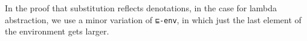 In the proof that substitution reflects denotations, in the case for
lambda abstraction, we use a minor variation of \texttt{⊑-env}, in which
just the last element of the environment gets larger.

\begin{fence}
\begin{code}%
\>[0]\AgdaSpace{}%
\AgdaSymbol{:}\AgdaSpace{}%
\AgdaSpace{}%
\AgdaSymbol{\{}\AgdaSymbol{\}}\AgdaSpace{}%
\AgdaSymbol{\{}\AgdaSpace{}%
\AgdaSymbol{:}\AgdaSpace{}%
\AgdaSpace{}%
\AgdaSymbol{\}}\AgdaSpace{}%
\AgdaSymbol{\{}\AgdaSpace{}%
\AgdaSpace{}%
\AgdaSpace{}%
\AgdaSymbol{\}}\<%
\\
\>[0][@{}l@{\AgdaIndent{0}}]%
\>[2]\AgdaSpace{}%
\AgdaSymbol{(}\AgdaSpace{}%
\AgdaSpace{}%
\AgdaSymbol{)}\AgdaSpace{}%
\AgdaSpace{}%
\AgdaSpace{}%
\AgdaSpace{}%
\<%
\\
%
\>[2]%
\>[1521I]\AgdaSpace{}%
\AgdaSpace{}%
\<%
\\
\>[.][@{}l@{}]\<[1521I]%
\>[4]\AgdaComment{-----------------}\<%
\\
%
\>[2]\AgdaSpace{}%
\AgdaSymbol{(}\AgdaSpace{}%
\AgdaSpace{}%
\AgdaSymbol{)}\AgdaSpace{}%
\AgdaSpace{}%
\AgdaSpace{}%
\AgdaSpace{}%
\<%
\\
\>[0]\AgdaSpace{}%
\AgdaSpace{}%
\AgdaSpace{}%
\AgdaSymbol{=}\AgdaSpace{}%
\AgdaSpace{}%
\AgdaSpace{}%
\AgdaSymbol{(}\AgdaSpace{}%
\AgdaSymbol{)}\<%
\\
\>[0][@{}l@{\AgdaIndent{0}}]%
\>[2]\<%
\\
%
\>[2]\AgdaSpace{}%
\AgdaSymbol{:}\AgdaSpace{}%
\AgdaSpace{}%
\AgdaSymbol{\{}\AgdaSpace{}%
\AgdaSpace{}%
\AgdaSymbol{\}}\AgdaSpace{}%
\AgdaSpace{}%
\AgdaSpace{}%
\AgdaSpace{}%
\AgdaSpace{}%
\AgdaSpace{}%
\AgdaSymbol{(}\AgdaSpace{}%

\end{code}
\end{fence}

